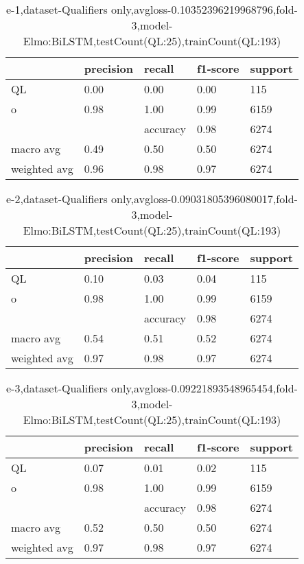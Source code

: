 \begin{table}[!ht] 
\centering
\caption{e-1,dataset-Qualifiers only,avgloss-0.10352396219968796,fold-3,model-Elmo:BiLSTM,testCount(QL:25),trainCount(QL:193)}\label{e-1data-qualS.tsv}
\begin{tabularx}{300pt}{|X|X|X|X|X|}
\hline
&precision&recall&f1-score&support\\
\hline
QL&0.00&0.00&0.00&115\\
\hline
o&0.98&1.00&0.99&6159\\
\hline
&&accuracy&0.98&6274\\
\hline
macro avg&0.49&0.50&0.50&6274\\
\hline
weighted avg&0.96&0.98&0.97&6274\\
\hline
\end{tabularx}
\end{table}
\begin{table}[!ht] 
\centering
\caption{e-2,dataset-Qualifiers only,avgloss-0.09031805396080017,fold-3,model-Elmo:BiLSTM,testCount(QL:25),trainCount(QL:193)}\label{e-2data-qualS.tsv}
\begin{tabularx}{300pt}{|X|X|X|X|X|}
\hline
&precision&recall&f1-score&support\\
\hline
QL&0.10&0.03&0.04&115\\
\hline
o&0.98&1.00&0.99&6159\\
\hline
&&accuracy&0.98&6274\\
\hline
macro avg&0.54&0.51&0.52&6274\\
\hline
weighted avg&0.97&0.98&0.97&6274\\
\hline
\end{tabularx}
\end{table}
\begin{table}[!ht] 
\centering
\caption{e-3,dataset-Qualifiers only,avgloss-0.09221893548965454,fold-3,model-Elmo:BiLSTM,testCount(QL:25),trainCount(QL:193)}\label{e-3data-qualS.tsv}
\begin{tabularx}{300pt}{|X|X|X|X|X|}
\hline
&precision&recall&f1-score&support\\
\hline
QL&0.07&0.01&0.02&115\\
\hline
o&0.98&1.00&0.99&6159\\
\hline
&&accuracy&0.98&6274\\
\hline
macro avg&0.52&0.50&0.50&6274\\
\hline
weighted avg&0.97&0.98&0.97&6274\\
\hline
\end{tabularx}
\end{table}
